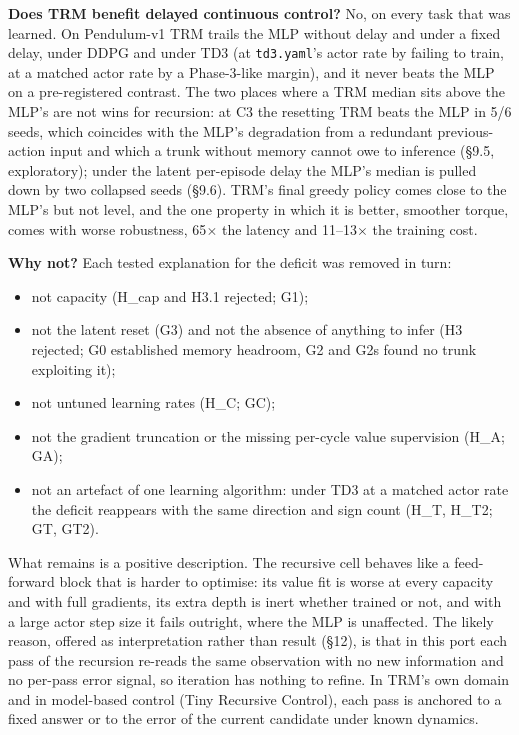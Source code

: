 \documentclass[11pt]{article}
\begin{document}
\textbf{Does TRM benefit delayed continuous control?} No, on every task that was learned. On Pendulum-v1 TRM trails the MLP without delay and under a fixed delay, under DDPG and under TD3 (at \texttt{td3.yaml}'s actor rate by failing to train, at a matched actor rate by a Phase-3-like margin), and it never beats the MLP on a pre-registered contrast. The two places where a TRM median sits above the MLP's are not wins for recursion: at C3 the resetting TRM beats the MLP in 5/6 seeds, which coincides with the MLP's degradation from a redundant previous-action input and which a trunk without memory cannot owe to inference (\S{}9.5, exploratory); under the latent per-episode delay the MLP's median is pulled down by two collapsed seeds (\S{}9.6). TRM's final greedy policy comes close to the MLP's but not level, and the one property in which it is better, smoother torque, comes with worse robustness, 65$\times$ the latency and 11--13$\times$ the training cost.



\textbf{Why not?} Each tested explanation for the deficit was removed in turn:



\begin{itemize}
\item not capacity (H\_cap and H3.1 rejected; G1);
\item not the latent reset (G3) and not the absence of anything to infer (H3 rejected; G0 established memory headroom, G2 and G2s found no trunk exploiting it);
\item not untuned learning rates (H\_C; GC);
\item not the gradient truncation or the missing per-cycle value supervision (H\_A; GA);
\item not an artefact of one learning algorithm: under TD3 at a matched actor rate the deficit reappears with the same direction and sign count (H\_T, H\_T2; GT, GT2).
\end{itemize}



What remains is a positive description. The recursive cell behaves like a feed-forward block that is harder to optimise: its value fit is worse at every capacity and with full gradients, its extra depth is inert whether trained or not, and with a large actor step size it fails outright, where the MLP is unaffected. The likely reason, offered as interpretation rather than result (\S{}12), is that in this port each pass of the recursion re-reads the same observation with no new information and no per-pass error signal, so iteration has nothing to refine. In TRM's own domain and in model-based control (Tiny Recursive Control), each pass is anchored to a fixed answer or to the error of the current candidate under known dynamics.
\end{document}
